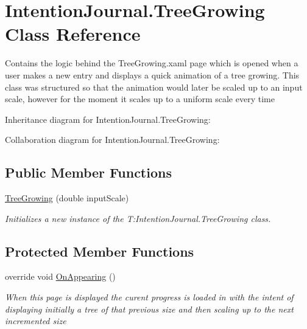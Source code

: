 \hypertarget{class_intention_journal_1_1_tree_growing}{}\section{Intention\+Journal.\+Tree\+Growing Class Reference}
\label{class_intention_journal_1_1_tree_growing}


Contains the logic behind the Tree\+Growing.\+xaml page which is opened when a user makes a new entry and displays a quick animation of a tree growing. This class was structured so that the animation would later be scaled up to an input scale, however for the moment it scales up to a uniform scale every time  




Inheritance diagram for Intention\+Journal.\+Tree\+Growing\+:


Collaboration diagram for Intention\+Journal.\+Tree\+Growing\+:
\subsection*{Public Member Functions}
\begin{DoxyCompactItemize}
\item 
\hyperlink{class_intention_journal_1_1_tree_growing_a00c6f397863757f49894e4d6e34ef0a7}{Tree\+Growing} (double input\+Scale)
\begin{DoxyCompactList}\small\item\em Initializes a new instance of the T\+:\+Intention\+Journal.\+Tree\+Growing class. \end{DoxyCompactList}\end{DoxyCompactItemize}
\subsection*{Protected Member Functions}
\begin{DoxyCompactItemize}
\item 
override void \hyperlink{class_intention_journal_1_1_tree_growing_a6aeb16fbd96d114be910265df535211f}{On\+Appearing} ()
\begin{DoxyCompactList}\small\item\em When this page is displayed the curent progress is loaded in with the intent of displaying initially a tree of that previous size and then scaling up to the next incremented size \end{DoxyCompactList}\end{DoxyCompactItemize}


